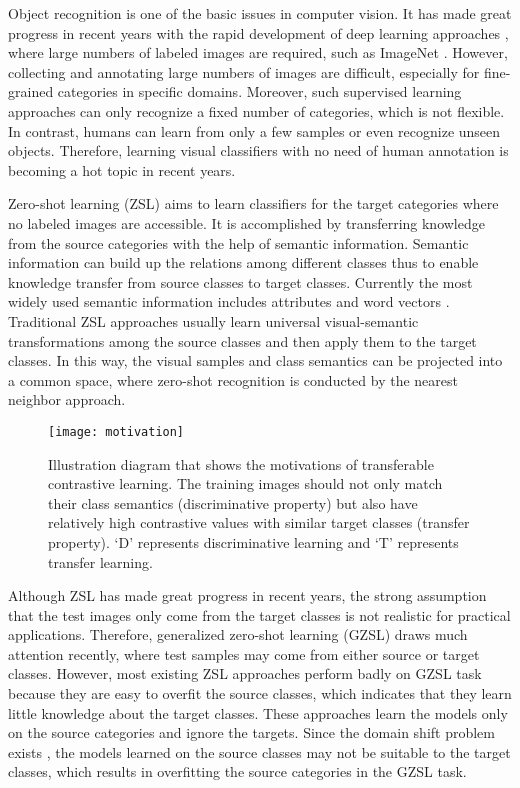 \documentclass[10pt,twocolumn,letterpaper]{article}
\begin{document}
Object recognition is one of the basic issues in computer vision. It has made great progress in recent years with the rapid development of deep learning approaches \cite{Krizhevsky2012,Christian2015,Simonyan2014,Kaiming2016}, where large numbers of labeled images are required, such as ImageNet \cite{ILSVRC15}. However, collecting and annotating large numbers of images are difficult, especially for fine-grained categories in specific domains. Moreover, such supervised learning approaches can only recognize a fixed number of categories, which is not flexible. In contrast, humans can learn from only a few samples or even recognize unseen objects. Therefore, learning visual classifiers with no need of human annotation is becoming a hot topic in recent years.

Zero-shot learning (ZSL) aims to learn classifiers for the target categories where no labeled images are accessible. It is accomplished by transferring knowledge from the source categories with the help of semantic information. Semantic information can build up the relations among different classes thus to enable knowledge transfer from source classes to target classes. Currently the most widely used semantic information includes attributes \cite{lampert2009learning,farhadi2009describing} and word vectors \cite{frome2013devise,akata2015evaluation}. Traditional ZSL approaches usually learn universal visual-semantic transformations among the source classes and then apply them to the target classes. In this way, the visual samples and class semantics can be projected into a common space, where zero-shot recognition is conducted by the nearest neighbor approach.

\begin{figure}[t]
\centering
\texttt{[image: motivation]}
\caption{Illustration diagram that shows the motivations of transferable contrastive learning. The training images should not only match their class semantics (discriminative property) but also have relatively high contrastive values with similar target classes (transfer property). `D' represents discriminative learning and `T' represents transfer learning.}
\label{fig:motivation}
\end{figure}

Although ZSL has made great progress in recent years, the strong assumption that the test images only come from the target classes is not realistic for practical applications. Therefore, generalized zero-shot learning (GZSL) \cite{chao2016empirical,Xian2017ZeroShotL} draws much attention recently, where test samples may come from either source or target classes. However, most existing ZSL approaches perform badly on GZSL task because they are easy to overfit the source classes, which indicates that they learn little knowledge about the target classes. These approaches learn the models only on the source categories and ignore the targets. Since the domain shift problem exists \cite{Fu2015TransductiveMZ}, the models learned on the source classes may not be suitable to the target classes, which results in overfitting the source categories in the GZSL task.
\end{document}
